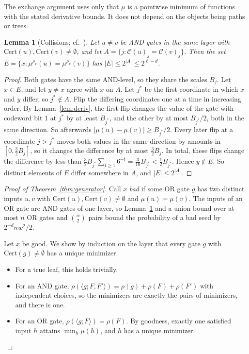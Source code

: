 \documentclass[11pt,letterpaper]{article}
\newtheorem{lemma}[theorem]{Lemma}
\theoremstyle{definition}
\theoremstyle{remark}
\newcommand{\Cert}{\mathrm{Cert}}
\begin{document}
The exchange argument uses only that $\mu$ is a pointwise minimum of functions with the
stated derivative bounds. It does not depend on the objects being paths or trees.

\begin{lemma}[Collisions; cf.\ {\cite[Theorem~2.4]{Hoza}}]\label{lem:collide}
Let $u\ne v$ be AND gates in the same layer with $\Cert(u),\Cert(v)\neq\emptyset$, and let
$A=\{j:\mathcal C(u)_j=\mathcal C(v)_j\}$. Then the set
$E=\{x:\mu^{\rho_x}(u)=\mu^{\rho_x}(v)\}$ has $|E|\le 2^{|A|}\le 2^{\ell-d}$.
\end{lemma}
\begin{proof}
Both gates have the same AND-level, so they share the scales $B_j$. Let $x\in
E$, and let $y\ne x$ agree with $x$ on $A$. Let $j^*$ be the first coordinate in
which $x$ and $y$ differ, so $j^*\notin A$. Flip the differing coordinates one at a
time in increasing order. By Lemma~\ref{lem:deriv}, the first flip changes the
value of the gate with codeword bit $1$ at $j^*$ by at least $B_{j^*}$, and the other by at most
$B_{j^*}/2$, both in the same direction. So afterwards $|\mu(u)-\mu(v)|\ge
B_{j^*}/2$. Every later flip at a coordinate $j>j^*$ moves both values in the same direction
by amounts in $[0,\frac32B_j]$, so it changes the difference by at most $\frac32B_j$. In
total, these flips change the difference by less than
$\frac32B_{j^*}\sum_{t\ge1}6^{-t}=\frac3{10}B_{j^*}<\frac12B_{j^*}$. Hence
$y\notin E$. So distinct elements of $E$ differ somewhere in $A$, and $|E|\le
2^{|A|}$.
\end{proof}

\begin{proof}[Proof of Theorem~\ref{thm:generator}]
Call $x$ \emph{bad} if some OR gate $g$ has two distinct inputs $u,v$ with
$\Cert(u),\Cert(v)\ne\emptyset$ and $\mu(u)=\mu(v)$. The inputs of an OR gate
are AND gates of one layer, so Lemma~\ref{lem:collide} and a union bound over at most $n$ OR
gates and $\binom w2$ pairs bound the probability of a bad seed by $2^{-d}nw^2/2$.

Let $x$ be good. We show by induction on the layer that every gate $g$ with
$\Cert(g)\ne\emptyset$ has a unique minimizer.
\begin{itemize}
\item For a true leaf, this holds trivially.
\item For an AND gate, $\rho(\langle g;F,F'\rangle)=\rho(g)+\rho(F)+\rho(F')$
 with independent choices, so the minimizers are exactly the pairs of minimizers,
 and there is one.
\item For an OR gate, $\rho(\langle g;F\rangle)=\rho(F)$. By goodness, exactly
 one satisfied input $h$ attains $\min_h\mu(h)$, and $h$ has a unique minimizer. \qedhere
\end{itemize}
\end{proof}
\end{document}
